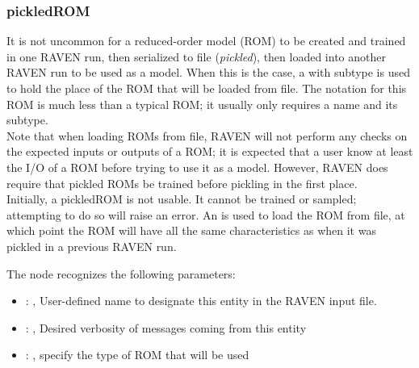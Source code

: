 \subsubsection{pickledROM}
  It is not uncommon for a reduced-order model (ROM) to be created and trained in one RAVEN run,
  then     serialized to file (\emph{pickled}), then loaded into another RAVEN run to be used as a
  model.  When this is     the case, a  with subtype  is used to
  hold the place of the ROM that will     be loaded from file.  The notation for this ROM is much
  less than a typical ROM; it usually only requires a name and     its subtype.     \\     Note that
  when loading ROMs from file, RAVEN will not perform any checks on the expected inputs or outputs
  of     a ROM; it is expected that a user know at least the I/O of a ROM before trying to use it as
  a model.     However, RAVEN does require that pickled ROMs be trained before pickling in the first
  place.     \\     Initially, a pickledROM is not usable.  It cannot be trained or sampled;
  attempting to do so will raise an     error.  An  is used to load the ROM from
  file, at which point the ROM will have all the same     characteristics as when it was pickled in
  a previous RAVEN run.

  The  node recognizes the following parameters:
    \begin{itemize}
      \item {}: , 
        User-defined name to designate this entity in the RAVEN input file.
      \item {}: , 
        Desired verbosity of messages coming from this entity
      \item {}: , 
        specify the type of ROM that will be used
  \end{itemize}

